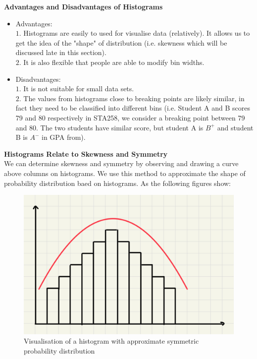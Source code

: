 \noindent
\textbf{Advantages and Disadvantages of Histograms}

\begin{itemize}
 \item Advantages:\\
 $1.$ Histograms are easily to used for visualise data (relatively). It allows us to get the idea of the "shape" of distribution (i.e. skewness which will be discussed late in this section).\\
 $2.$ It is also flexible that people are able to modify bin widths.
 \item Disadvantages:\\
 $1.$ It is not suitable for small data sets.\\
 $2.$ The values from histograms close to breaking points are likely similar, in fact they need to be classified into different bins (i.e. Student A and B scores 79 and 80 respectively in STA258, we consider a breaking point between 79 and 80. The two students have similar score, but student A is $B^+$ and student B is $A^-$ in GPA from).
\end{itemize}

\noindent
\textbf{Histograms Relate to Skewness and Symmetry}\\

\noindent
We can determine skewness and symmetry by observing and drawing a curve above columns on histograms. We use this method to approximate the shape of probability distribution baed on histograms. As the following figures show:

\begin{figure}[H]
 \centering
 \includegraphics[scale=0.15]{Section1/img/HisSymm.jpg}
 \caption{Visualisation of a histogram with approximate symmetric probability distribution}
\end{figure}

